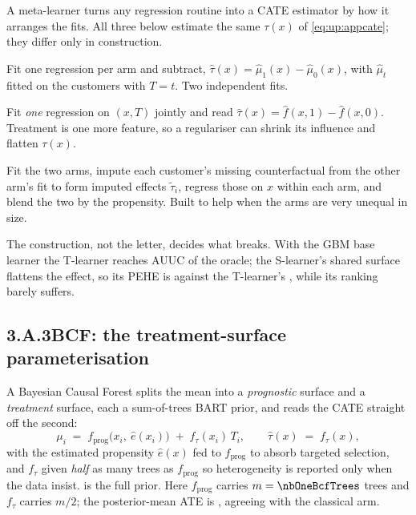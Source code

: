 A meta-learner turns any regression routine into a CATE estimator by how it arranges the fits. All
three below estimate the same $\tau(x)$ of \cref{eq:up:appcate}; they differ only in construction.

\begin{description}[leftmargin=*, style=nextline]
  \item[T-learner.] Fit one regression per arm and subtract,
        $\hat\tau(x) = \hat\mu_1(x) - \hat\mu_0(x)$, with $\hat\mu_t$ fitted on the customers with
        $T = t$. Two independent fits.
  \item[S-learner.] Fit \emph{one} regression on $(x, T)$ jointly and read
        $\hat\tau(x) = \hat f(x, 1) - \hat f(x, 0)$. Treatment is one more feature, so a regulariser
        can shrink its influence and flatten $\tau(x)$.
  \item[X-learner.] Fit the two arms, impute each customer's missing counterfactual from the other
        arm's fit to form imputed effects $\tilde\tau_i$, regress those on $x$ within each arm, and
        blend the two by the propensity. Built to help when the arms are very unequal in size.
\end{description}
%
The construction, not the letter, decides what breaks. With the GBM base learner the T-learner reaches
AUUC \nbOneGbmTAuuc{} of the oracle; the S-learner's shared surface flattens the effect, so its PEHE is
\eur{\nbOneGbmSPehe} against the T-learner's \eur{\nbOneGbmTPehe}, while its ranking barely suffers.

\subsection*{3.A.3\quad BCF: the treatment-surface parameterisation}

A Bayesian Causal Forest \citep{hahn2020} splits the mean into a \emph{prognostic} surface and a
\emph{treatment} surface, each a sum-of-trees BART prior, and reads the CATE straight off the second:
%
\begin{equation}
  \mu_i \;=\; f_{\text{prog}}\big(x_i,\ \hat e(x_i)\big) \;+\; f_{\tau}(x_i)\, T_i,
  \qquad
  \hat\tau(x) \;=\; f_\tau(x),
  \label{eq:up:appbcf}
\end{equation}
%
with the estimated propensity $\hat e(x)$ fed to $f_{\text{prog}}$ to absorb targeted selection, and
$f_\tau$ given \emph{half} as many trees as $f_{\text{prog}}$ so heterogeneity is reported only when
the data insist.  is the full prior. Here $f_{\text{prog}}$ carries
$m = \nbOneBcfTrees$ trees and $f_\tau$ carries $m/2$; the posterior-mean ATE is \eur{\nbOneBcfAte},
agreeing with the classical arm.

